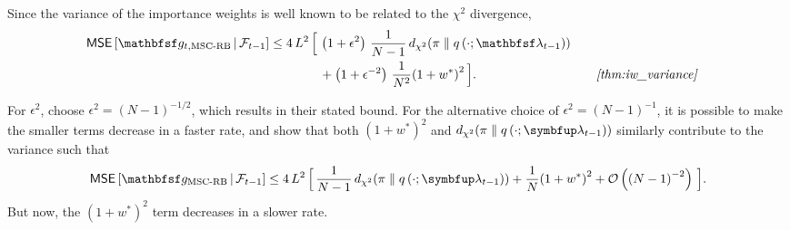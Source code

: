 \begin{proofEnd}
  Since the variance of the importance weights is well known to be related to the \(\chi^2\) divergence,
  \begin{alignat}{2}
    \mathsf{MSE}\left[ \rvvg_{t,\text{MSC-RB}} \,\middle|\, \mathcal{F}_{t-1} \right] \leq
    4\,L^2 \, \Big[\,&
     \left( 1 + \epsilon^2 \right)\, \frac{1}{N-1}\,\DChi{\pi}{q\left(\cdot; \rvvlambda_{t-1}\right)}
    \nonumber
     \\
     &+
     \left(1 + \epsilon^{-2} \right)\, \frac{1}{N^2} {\left(1 + w^*\right)}^2 
    \,\Big].
    &&\quad\text{\textit{\cref{thm:iw_variance}}}
    \nonumber
  \end{alignat}

  For \(\epsilon^2\), \citeauthor{cardoso_brsnis_2022} choose \(\epsilon^2 = {\left(N-1\right)}^{-1/2}\), which results in their stated bound. 
  For the alternative choice of \(\epsilon^2 = {\left(N-1\right)}^{-1}\), it is possible to make the smaller terms decrease in a faster rate, and show that both \({\left(1 + w^*\right)}^2\) and \(\DChi{\pi}{q\left(\cdot; \vlambda_{t-1}\right)}\) similarly contribute to the variance such that
  \begin{align*}
    \mathsf{MSE}\left[ \rvvg_{\text{MSC-RB}} \,\middle|\, \mathcal{F}_{t-1} \right] \leq
    4\,L^2 \, \Big[\,
      \frac{1}{N-1}\,\DChi{\pi}{q\left(\cdot; \vlambda_{t-1}\right)}
      +
      \frac{1}{N} {\left(1 + w^*\right)}^2
      +
      \mathcal{O}\left({\left(N-1\right)}^{-2}\right)
    \,\Big].
  \end{align*}
  But now, the \({\left(1+w^*\right)}^2\) term decreases in a slower rate.
\end{proofEnd}

